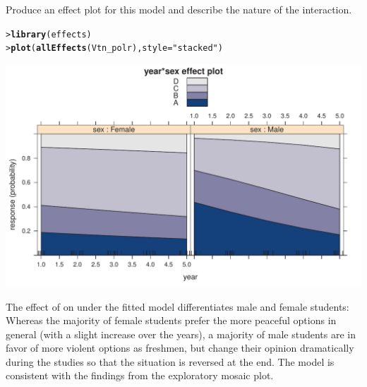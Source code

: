 \documentclass[10pt]{report}\usepackage[]{graphicx}\usepackage[]{color}
\makeatletter
\newcommand{\hlstr}[1]{\textcolor[rgb]{0.192,0.494,0.8}{#1}}%
\newcommand{\hlstd}[1]{\textcolor[rgb]{0.345,0.345,0.345}{#1}}%
\newcommand{\hlkwc}[1]{\textcolor[rgb]{0.333,0.667,0.333}{#1}}%
\newcommand{\hlkwd}[1]{\textcolor[rgb]{0.737,0.353,0.396}{\textbf{#1}}}%
\newenvironment{kframe}{%
 \def\at@end@of@kframe{}%
 \ifinner\ifhmode%
  \def\at@end@of@kframe{\end{minipage}}%
  \begin{minipage}{\columnwidth}%
 \fi\fi%
 \def\FrameCommand##1{\hskip\@totalleftmargin \hskip-\fboxsep
 \colorbox{shadecolor}{##1}\hskip-\fboxsep
     \hskip-\linewidth \hskip-\@totalleftmargin \hskip\columnwidth}%
 \MakeFramed {\advance\hsize-\width
   \@totalleftmargin\z@ \linewidth\hsize
   \@setminipage}}%
 {\par\unskip\endMakeFramed%
 \at@end@of@kframe}
\newenvironment{knitrout}{}{} %
\renewenvironment{knitrout}{\small\renewcommand{\baselinestretch}{.85}}{} %
\makeatother
\begin{document}
\begin{Exercises}
\begin{enumerate*}
    \item Produce an effect plot for this model and describe the nature of the interaction.
    \begin{ans}
\begin{knitrout}\footnotesize
{}\color{fgcolor}\begin{kframe}
\begin{alltt}
\hlstd{> }\hlkwd{library}\hlstd{(effects)}
\hlstd{> }\hlkwd{plot}\hlstd{(}\hlkwd{allEffects}\hlstd{(Vtn_polr),} \hlkwc{style} \hlstd{=} \hlstr{"stacked"}\hlstd{)}
\end{alltt}
\end{kframe}

\centerline{\includegraphics[width=.8\textwidth]{soln/fig/ex8_4d-1} }



\end{knitrout}
    The effect of  on  under the fitted model 
    differentiates male and female students: Whereas the majority of
    female students prefer the more peaceful options in general (with a slight
    increase over the years), a majority of male students are in favor of more
    violent options as freshmen, but change
    their opinion dramatically during the studies so that the
    situation is reversed at the end. The model is consistent with the
    findings from the exploratory mosaic plot.
    \end{ans}
    

\end{enumerate*}
\end{Exercises}
\end{document}
